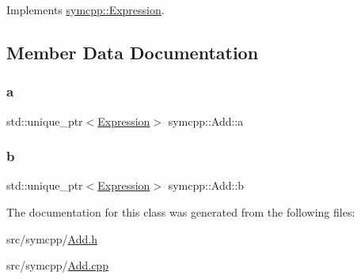 Implements \mbox{\hyperlink{classsymcpp_1_1Expression_aaef29b0afa2d6c21fe35f47a1be76134}{symcpp\+::\+Expression}}.



\subsection{Member Data Documentation}
\mbox{\label{classsymcpp_1_1Add_a9c4fbbc6d99a6625e08e141d4f2bc615}} 
\subsubsection{\texorpdfstring{a}{a}}
{\footnotesize\ttfamily std\+::unique\+\_\+ptr$<$\mbox{\hyperlink{classsymcpp_1_1Expression}{Expression}}$>$ symcpp\+::\+Add\+::a\hspace{0.3cm}{\ttfamily [private]}}

\mbox{\label{classsymcpp_1_1Add_af79047cdc26b03c717544e86df5590a6}} 
\subsubsection{\texorpdfstring{b}{b}}
{\footnotesize\ttfamily std\+::unique\+\_\+ptr$<$\mbox{\hyperlink{classsymcpp_1_1Expression}{Expression}}$>$ symcpp\+::\+Add\+::b\hspace{0.3cm}{\ttfamily [private]}}



The documentation for this class was generated from the following files\+:\begin{DoxyCompactItemize}
\item 
src/symcpp/\mbox{\hyperlink{Add_8h}{Add.\+h}}\item 
src/symcpp/\mbox{\hyperlink{Add_8cpp}{Add.\+cpp}}\end{DoxyCompactItemize}
